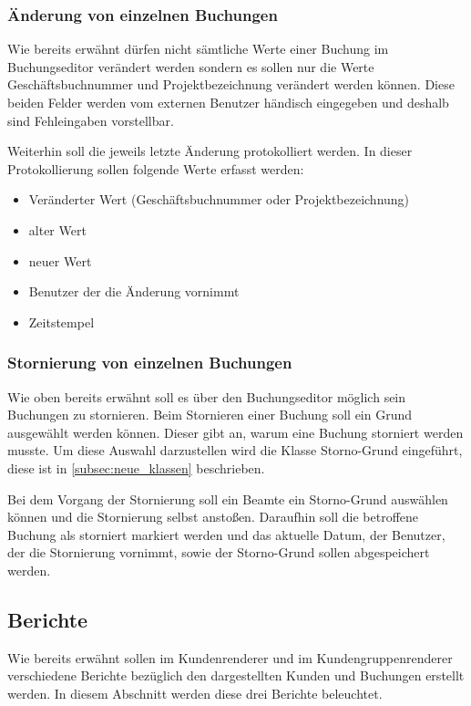 \subsubsection{Änderung von einzelnen Buchungen} \label{subsubsec:aendern_buchung}
Wie bereits erwähnt dürfen nicht sämtliche Werte einer Buchung im Buchungseditor verändert werden sondern es sollen nur die Werte Geschäftsbuchnummer und Projektbezeichnung verändert werden können.
Diese beiden Felder werden vom externen Benutzer händisch eingegeben und deshalb sind Fehleingaben vorstellbar.

Weiterhin soll die jeweils letzte Änderung protokolliert werden. In dieser Protokollierung  sollen folgende Werte erfasst werden:
\begin{itemize}
\item Veränderter Wert (Geschäftsbuchnummer oder Projektbezeichnung)
\item alter Wert
\item neuer Wert
\item Benutzer der die Änderung vornimmt
\item Zeitstempel
\end{itemize}

\subsubsection{Stornierung von einzelnen Buchungen} \label{subsubsec:storno_buchung}
Wie oben bereits erwähnt soll es über den Buchungseditor möglich sein Buchungen zu stornieren. Beim Stornieren einer Buchung soll ein Grund ausgewählt werden können. Dieser gibt an, warum eine Buchung storniert werden musste. Um diese Auswahl darzustellen wird die Klasse Storno-Grund eingeführt, diese ist in \ref{subsec:neue_klassen} beschrieben.

Bei dem Vorgang der Stornierung soll ein Beamte ein Storno-Grund auswählen können und die Stornierung selbst anstoßen. Daraufhin soll die betroffene Buchung als storniert markiert werden und das aktuelle Datum, der Benutzer, der die Stornierung vornimmt, sowie der Storno-Grund sollen abgespeichert werden.

\subsection{Berichte}
Wie bereits erwähnt sollen im Kundenrenderer und im Kundengruppenrenderer verschiedene Berichte bezüglich den dargestellten Kunden und Buchungen erstellt werden. In diesem Abschnitt werden diese drei Berichte beleuchtet.  


